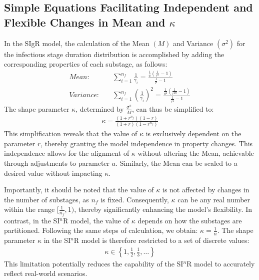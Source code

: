 \documentclass[12pt]{article}
\begin{document}
\subsection{Simple Equations Facilitating Independent and Flexible Changes in Mean and $\kappa$}
In the SIgR model, the calculation of the Mean $(M)$ and Variance $(\sigma^2)$ for the infectious stage duration distribution is accomplished by adding the corresponding properties of each substage, as follows:
\begin{align}
    Mean: \quad  &\sum_{i=1}^{n_f} \frac{1}{\gamma_i} = \frac{\frac{1}{a} (\frac{1}{r^n} - 1)}{\frac{1}{r} -1} \\
    Variance: \quad &\sum_{i=1}^{n_f} \left(\frac{1}{\gamma_i} \right)^2 = \frac{\frac{1}{a^2} (\frac{1}{r^{2n}} - 1)}{\frac{1}{r^2} -1}
\end{align}
The shape parameter $\kappa$, determined by $\frac{\sigma^2}{M}$, can thus be simplified to:
\begin{align}
    \kappa = \frac{(1+r^{n_f}) (1-r)}{(1+r) (1-r^{n_f})}
\end{align}
This simplification reveals that the value of $\kappa$ is exclusively dependent on the parameter $r$, thereby granting the model independence in property changes. This independence allows for the alignment of $\kappa$ without altering the Mean, achievable through adjustments to parameter $a$. Similarly, the Mean can be scaled to a desired value without impacting $\kappa$.

Importantly, it should be noted that the value of $\kappa$ is not affected by changes in the number of substages, as $n_f$ is fixed. Consequently, $\kappa$ can be any real number within the range $[\frac{1}{n_f}, 1)$, thereby significantly enhancing the model's flexibility. In contrast, in the SI$^n$R model, the value of $\kappa$ depends on how the substages are partitioned. Following the same steps of calculation, we obtain: $\kappa = \frac{1}{n}$. The shape parameter $\kappa$ in the SI$^n$R model is therefore restricted to a set of discrete values:
\begin{align*}
    \kappa \in \left\{1, \frac{1}{2}, \frac{1}{3}, \dots \right\}
\end{align*}
This limitation potentially reduces the capability of the SI$^n$R model to accurately reflect real-world scenarios.
\end{document}
